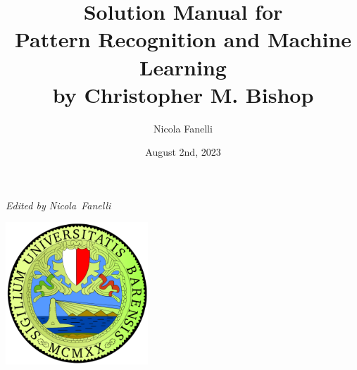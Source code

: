 \documentclass[12pt]{article}
\title{Solution Manual for\\Pattern Recognition and Machine Learning\\by Christopher M. Bishop}
\author{Nicola Fanelli}
\date{August 2nd, 2023}
\begin{document}
\begin{titlepage}
    \centering
    \vspace*{1cm}
    
    \Huge\textbf{\thetitle}
    
    \vspace{0.5cm}
    \Large\textit{Edited by Nicola~Fanelli}
    
    \vfill
    
    \vspace{0.8cm}
    
    \includegraphics[width=0.4\textwidth]{uniba-logo.png} %
    
    \vspace{1cm}
    
    \Large\thedate
    
\end{titlepage}

\newpage




\end{document}
